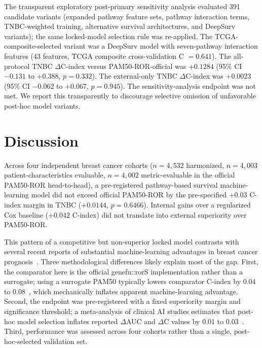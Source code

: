 \documentclass[11pt,letterpaper]{article}
\begin{document}
The transparent exploratory post-primary sensitivity analysis evaluated 391 candidate variants (expanded pathway feature sets, pathway interaction terms, TNBC-weighted training, alternative survival architectures, and DeepSurv variants); the same locked-model selection rule was re-applied. The TCGA-composite-selected variant was a DeepSurv model with seven-pathway interaction features (43 features, TCGA composite cross-validation C $= 0.641$). The all-protocol TNBC $\Delta$C-index versus PAM50-ROR-official was $+0.1284$ (95\% CI $-0.131$ to $+0.388$, $p = 0.332$). The external-only TNBC $\Delta$C-index was $+0.0023$ (95\% CI $-0.062$ to $+0.067$, $p = 0.945$). The sensitivity-analysis endpoint was not met. We report this transparently to discourage selective omission of unfavorable post-hoc model variants.


\section*{Discussion}

Across four independent breast cancer cohorts ($n = 4{,}532$ harmonized, $n = 4{,}003$ patient-characteristics evaluable, $n = 4{,}002$ metric-evaluable in the official PAM50-ROR head-to-head), a pre-registered pathway-based survival machine-learning model did not exceed official PAM50-ROR by the pre-specified $+0.03$ C-index margin in TNBC ($+0.0144$, $p = 0.6466$). Internal gains over a regularized Cox baseline ($+0.042$ C-index) did not translate into external superiority over PAM50-ROR.

This pattern of a competitive but non-superior locked model contrasts with several recent reports of substantial machine-learning advantages in breast cancer prognosis~\cite{chakraborty2021explainable,liu2021identification,kallah2025breast}. Three methodological differences likely explain most of the gap. First, the comparator here is the official genefu::rorS implementation rather than a surrogate; using a surrogate PAM50 typically lowers comparator C-index by 0.04 to 0.08~\cite{gendoo2016genefu}, which mechanically inflates apparent machine-learning advantage. Second, the endpoint was pre-registered with a fixed superiority margin and significance threshold; a meta-analysis of clinical AI studies estimates that post-hoc model selection inflates reported $\Delta$AUC and $\Delta$C values by 0.01 to 0.03~\cite{nagendran2020artificial}. Third, performance was assessed across four cohorts rather than a single, post-hoc-selected validation set.
\end{document}
